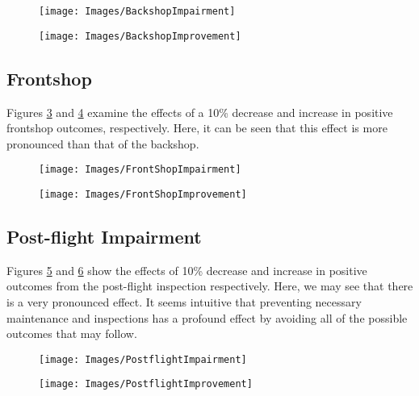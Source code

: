\documentclass[12pt]{amsart}
\begin{document}
\begin{figure}
	\centering
	\texttt{[image: Images/BackshopImpairment]}
	\caption{}
	\label{fig:backshopimpairment}
\end{figure}
\begin{figure}
	\centering
	\texttt{[image: Images/BackshopImprovement]}
	\caption{}
	\label{fig:backshopimprovement}
\end{figure}

\subsection{Frontshop}
Figures \ref{fig:frontshopimpairment} and \ref{fig:frontshopimprovement}
examine the effects of a 10\% decrease and increase in positive 
frontshop outcomes, respectively. Here, it can be seen that this effect is more
pronounced than that of the backshop.

\begin{figure}
	\centering
	\texttt{[image: Images/FrontShopImpairment]}
	\caption{}
	\label{fig:frontshopimpairment}
\end{figure}
\begin{figure}
	\centering
	\texttt{[image: Images/FrontShopImprovement]}
	\caption{}
	\label{fig:frontshopimprovement}
\end{figure}

\subsection{Post-flight Impairment}

Figures \ref{fig:postflightimpairment} and \ref{fig:postflightimprovement}
show the effects of 10\% decrease and increase in positive outcomes
from the post-flight inspection respectively.
Here, we may see that there is a very pronounced effect.
It seems intuitive that preventing necessary maintenance and 
inspections has a profound effect by avoiding all of the possible
outcomes that may follow.

\begin{figure}
	\centering
	\texttt{[image: Images/PostflightImpairment]}
	\caption{}
	\label{fig:postflightimpairment}
\end{figure}
\begin{figure}
	\centering
	\texttt{[image: Images/PostflightImprovement]}
	\caption{}
	\label{fig:postflightimprovement}
\end{figure}
\end{document}
